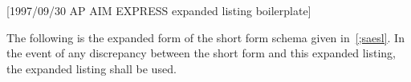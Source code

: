 [1997/09/30 AP AIM EXPRESS expanded listing boilerplate]

  The following \Express{} is the expanded form of the short
form schema given in~\ref{;saesl}. In the event of any discrepancy
between the short form and this expanded listing, the expanded
listing shall be used.

\endinput
